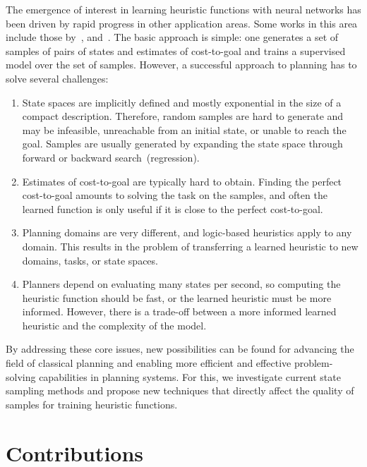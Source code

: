 The emergence of interest in learning heuristic functions with neural networks has been driven by rapid progress in other application areas. Some works in this area include those by~\citet{samadi2008learning,arfaee2011learning,agostinelli2019solving,yu2020learning,shen2020learning,ferber2020neural,toyer2020asnets,ferber2022neural}, and~\citet{otoole2022sampling}. The basic approach is simple: one generates a set of samples of pairs of states and estimates of cost-to-goal and trains a supervised model over the set of samples. However, a successful approach to planning has to solve several challenges:

\begin{enumerate}[label=C\arabic*),left=0pt]
    \itemsep0pt
    \item State spaces are implicitly defined and mostly exponential in the size of a compact description. Therefore, random samples are hard to generate and may be infeasible, unreachable from an initial state, or unable to reach the goal. Samples are usually generated by expanding the state space through forward or backward search~(regression).
    \item Estimates of cost-to-goal are typically hard to obtain. Finding the perfect cost-to-goal amounts to solving the task on the samples, and often the learned function is only useful if it is close to the perfect cost-to-goal.
    \item Planning domains are very different, and logic-based heuristics apply to any domain. This results in the problem of transferring a learned heuristic to new domains, tasks, or state spaces.
    \item Planners depend on evaluating many states per second, so computing the heuristic function should be fast, or the learned heuristic must be more informed. However, there is a trade-off between a more informed learned heuristic and the complexity of the model.
\end{enumerate}

By addressing these core issues, new possibilities can be found for advancing the field of classical planning and enabling more efficient and effective problem-solving capabilities in planning systems. For this, we investigate current state sampling methods and propose new techniques that directly affect the quality of samples for training heuristic functions.

\section{Contributions}
\label{sec:contributions}

